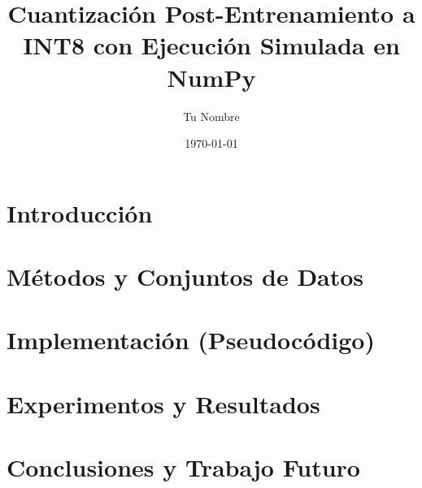 \documentclass[11pt,a4paper]{article}
\title{Cuantización Post-Entrenamiento a INT8 con Ejecución Simulada en NumPy}
\author{Tu Nombre}
\date{\today}
\begin{document}
\maketitle

\begin{abstract}

\end{abstract}

\tableofcontents
\listoffigures
\listoftables

\section{Introducción}


\section{Métodos y Conjuntos de Datos}


\section{Implementación (Pseudocódigo)}


\section{Experimentos y Resultados}


\section{Conclusiones y Trabajo Futuro}




\end{document}

